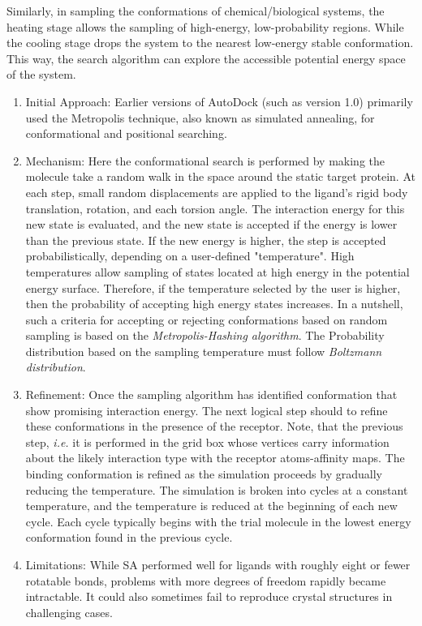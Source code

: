 \documentclass[11pt]{article}
\begin{document}
\begin{enumerate}
\begin{enumerate}
Similarly, in sampling the conformations of chemical/biological systems, the heating stage allows the sampling of high-energy, low-probability regions. While the cooling stage drops the system to the nearest low-energy stable conformation. This way, the search algorithm can explore the accessible potential energy space of the system. 
    \begin{enumerate}
    \item Initial Approach: Earlier versions of AutoDock (such as version 1.0) primarily used the Metropolis technique, also known as simulated annealing, for conformational and positional searching.
    \item Mechanism: Here the conformational search is performed by making the molecule take a random walk in the space around the static target protein. At each step, small random displacements are applied to the ligand's rigid body translation, rotation, and each torsion angle. The interaction energy for this new state is evaluated, and the new state is accepted if the energy is lower than the previous state. If the new energy is higher, the step is accepted probabilistically, depending on a user-defined "temperature". High temperatures allow sampling of states located at high energy in the potential energy surface. Therefore, if the temperature selected by the user is higher, then the probability of accepting high energy states increases. In a nutshell, such a criteria for accepting or rejecting conformations based on random sampling is based on the \textit{Metropolis-Hashing algorithm}. The Probability distribution based on the sampling temperature must follow \textit{Boltzmann distribution}. 
    \item Refinement: Once the sampling algorithm has identified conformation that show promising interaction energy. The next logical step should to refine these conformations in the presence of the receptor. Note, that the previous step, \textit{i.e.} it is performed in the grid box whose vertices carry information about the  likely interaction type with the receptor atoms-affinity maps.  The binding conformation is refined as the simulation proceeds by gradually reducing the temperature. The simulation is broken into cycles at a constant temperature, and the temperature is reduced at the beginning of each new cycle. Each cycle typically begins with the trial molecule in the lowest energy conformation found in the previous cycle.
    \item Limitations: While SA performed well for ligands with roughly eight or fewer rotatable bonds, problems with more degrees of freedom rapidly became intractable. It could also sometimes fail to reproduce crystal structures in challenging cases.

\end{enumerate}
\end{enumerate}
\end{enumerate}
\end{document}
